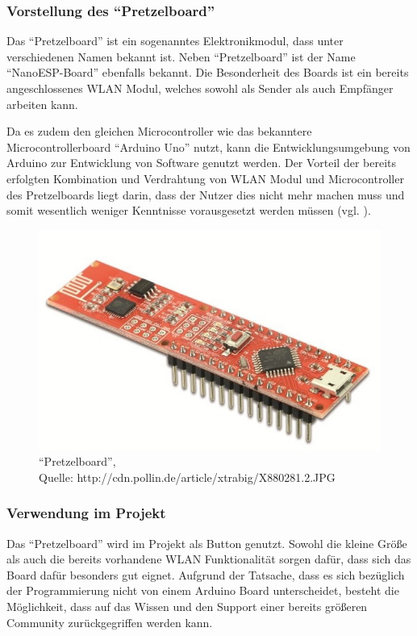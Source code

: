 \subsubsection{Vorstellung des ``Pretzelboard''}        
\label{sec:Vorstellung des ``Pretzelboard''} 
Das ``Pretzelboard'' ist ein sogenanntes Elektronikmodul, dass unter verschiedenen Namen bekannt ist. Neben ``Pretzelboard'' ist der Name ``NanoESP-Board'' ebenfalls bekannt. Die Besonderheit des Boards ist ein bereits angeschlossenes \ac{WLAN} Modul, welches sowohl als Sender als auch Empfänger arbeiten kann. 

Da es zudem den gleichen Microcontroller wie das bekanntere Microcontrollerboard ``Arduino Uno'' nutzt, kann die Entwicklungsumgebung von Arduino zur Entwicklung von Software genutzt werden. 
Der Vorteil der bereits erfolgten Kombination und Verdrahtung von WLAN Modul und Microcontroller des Pretzelboards liegt darin, dass der Nutzer dies nicht mehr machen muss und somit wesentlich weniger Kenntnisse vorausgesetzt werden müssen (vgl. \cite{.b}\cite{.kafka}\cite{FranzisVerlagGmbH.27.11.2015}).

\begin{figure}[!htb]
	\centering
	\includegraphics[scale=0.4]{Pretzel.jpg}
	\caption[``Pretzelboard'']{``Pretzelboard'',\\ Quelle: http://cdn.pollin.de/article/xtrabig/X880281.2.JPG}
\end{figure}

\subsubsection{Verwendung im Projekt}        
\label{sec:Verwendung des ``Pretzelboard''} 
Das ``Pretzelboard'' wird im Projekt als Button genutzt. Sowohl die kleine Größe als auch die bereits vorhandene \ac{WLAN} Funktionalität sorgen dafür, dass sich das Board dafür besonders gut eignet. Aufgrund der Tatsache, dass es sich bezüglich der Programmierung nicht von einem Arduino Board unterscheidet, besteht die Möglichkeit, dass auf das Wissen und den Support einer bereits größeren Community zurückgegriffen werden kann. 

